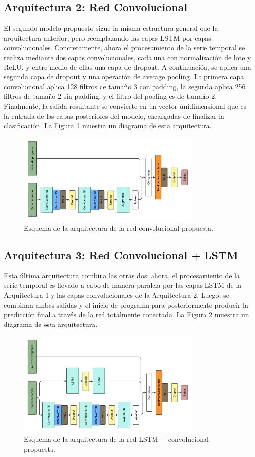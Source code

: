 \documentclass[../../main.tex]{subfiles}
\begin{document}
\subsection{Arquitectura 2: Red Convolucional}
El segundo modelo propuesto sigue la misma estructura general que la arquitectura
anterior, pero reemplazando las capas LSTM por capas convolucionales. Concretamente, ahora
el procesamiento de la serie temporal se realiza mediante dos capas convolucionales, cada
una con normalización de lote y ReLU, y entre medio de ellas una capa de dropout. A
continuación, se aplica una segunda capa de dropout y una operación de average pooling. La
primera capa convolucional aplica 128 filtros de tamaño 3 con padding, la segunda aplica
256 filtros de tamaño 2 sin padding, y el filtro del pooling es de tamaño 2. Finalmente,
la salida resultante se convierte en un vector unidimensional que es la entrada de las
capas posteriores del modelo, encargadas de finalizar la clasificación. La Figura
\ref{fig:conv} muestra un diagrama de esta arquitectura.
\begin{figure}[ht]
    \centering
    \includegraphics[width=0.8\textwidth]{figs/conv.png}
    \caption{Esquema de la arquitectura de la red convolucional propuesta.}
    \label{fig:conv}
\end{figure}

\subsection{Arquitectura 3: Red Convolucional + LSTM}
Esta última arquitectura combina las otras dos: ahora, el procesamiento de la serie
temporal es llevado a cabo de manera paralela por las capas LSTM de la Arquitectura 1
y las capas convolucionales de la Arquitectura 2. Luego, se combinan ambas salidas y
el inicio de programa para posteriormente producir la predicción final a través de la
red totalmente conectada. La Figura \ref{fig:lstm_v2_conv} muestra un diagrama de esta
arquitectura.

\begin{figure}[ht]
    \centering
    \includegraphics[width=0.8\textwidth]{figs/lstm_conv.png}
    \caption{Esquema de la arquitectura de la red LSTM + convolucional propuesta.}
    \label{fig:lstm_v2_conv}
\end{figure}
\end{document}
